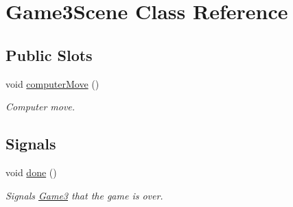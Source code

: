 \hypertarget{classGame3Scene}{\section{\-Game3\-Scene \-Class \-Reference}
\label{classGame3Scene}
}
\subsection*{\-Public \-Slots}
\begin{DoxyCompactItemize}
\item 
void \hyperlink{classGame3Scene_a8baab5c5cf08a3da4c045237124f3312}{computer\-Move} ()
\begin{DoxyCompactList}\small\item\em \-Computer move. \end{DoxyCompactList}\end{DoxyCompactItemize}
\subsection*{\-Signals}
\begin{DoxyCompactItemize}
\item 
\hypertarget{classGame3Scene_afdf219b82363a1e8038a27d02df45cd2}{void \hyperlink{classGame3Scene_afdf219b82363a1e8038a27d02df45cd2}{done} ()}\label{classGame3Scene_afdf219b82363a1e8038a27d02df45cd2}

\begin{DoxyCompactList}\small\item\em \-Signals \hyperlink{classGame3}{\-Game3} that the game is over. \end{DoxyCompactList}\end{DoxyCompactItemize}
